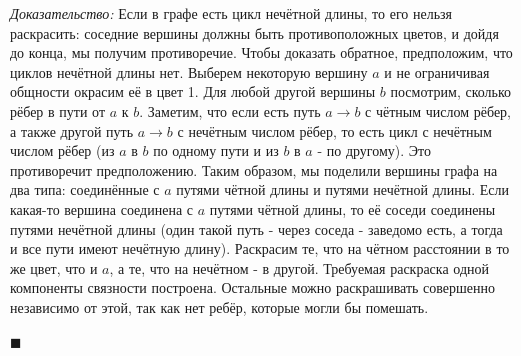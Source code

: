 \documentclass[a4paper, 12pt]{article}
\begin{document}
\noindent
\textit{Доказательство:} Если в графе есть цикл нечётной длины, то его нельзя раскрасить: соседние вершины должны быть противоположных цветов, и дойдя до конца, мы получим противоречие. Чтобы доказать обратное, предположим, что циклов нечётной длины нет. Выберем некоторую вершину $a$ и не ограничивая общности окрасим её в цвет 1. Для любой другой вершины $b$ посмотрим, сколько рёбер в пути от $a$ к $b$. Заметим, что если есть путь $a \rightarrow b$ с чётным числом рёбер, а также другой путь $a \rightarrow b$ с нечётным числом рёбер, то есть цикл с нечётным числом рёбер (из $a$ в $b$ по одному пути и из $b$ в $a$ - по другому). Это противоречит предположению. Таким образом, мы поделили вершины графа на два типа: соединённые с $a$ путями чётной длины и путями нечётной длины. Если какая-то вершина соединена с $a$ путями чётной длины, то её соседи соединены путями нечётной длины (один такой путь - через соседа - заведомо есть, а тогда и все пути имеют нечётную длину). Раскрасим те, что на чётном расстоянии в то же цвет, что и $a$, а те, что на нечётном - в другой. Требуемая раскраска одной компоненты связности построена. Остальные можно раскрашивать совершенно независимо от этой, так как нет ребёр, которые могли бы помешать.

\noindent
$\blacksquare$
\end{document}
